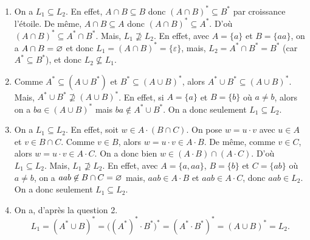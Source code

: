 \begin{enumerate}
\begin{enumerate}[label=\textit{(\arabic*)}]
			\item On a $L_1 \subseteq L_2$. En effet, $A \cap B \subseteq B$\/ donc $(A \cap B)^* \subseteq B^*$\/ par croissance l'étoile. De même, $A \cap B \subseteq A$\/ donc $(A \cap B)^* \subseteq A^*$. D'où $(A\cap B)^* \subseteq A^* \cap B^*$. Mais, $L_1 \not\supseteq L_2$. En effet, avec $A = \{a\}$\/ et $B = \{aa\}$, on a $A \cap B = \varnothing$\/ et donc $L_1 = (A \cap B)^* = \{\varepsilon\}$, mais, $L_2 = A^* \cap B^* = B^*$\/ (car $A^* \subseteq B^*$), et donc $L_2 \not\subseteq L_1$.
			\item Comme $A^* \subseteq (A \cup B^*)$\/ et $B^* \subseteq (A \cup B)^*$, alors $A^* \cup B^* \subseteq (A \cup B)^*$. Mais, $A^* \cup B^* \not\supseteq (A \cup B)^*$. En effet, si $A = \{a\}$\/ et $B = \{b\}$\/ où $a \neq b$, alors on a $ba \in (A \cup B)^*$\/ mais $ba\not\in A^* \cup B^*$. On a donc seulement $L_1 \subseteq L_2$.
			\item On a $L_1 \subseteq L_2$. En effet, soit $w \in A \cdot (B \cap C)$. On pose $w = u \cdot v$\/ avec $u \in A$\/ et $v \in B \cap C$. Comme $v \in B$, alors $w= u\cdot v \in A \cdot B$. De même, comme $v \in C$, alors $w = u\cdot v \in A \cdot C$. On a donc bien $w \in (A \cdot B) \cap (A \cdot C)$. D'où $L_1 \subseteq L_2$. Mais, $L_1 \not\supseteq L_2$. En effet, avec $A = \{a,aa\}$, $B = \{b\}$\/ et $C = \{ab\}$\/ où $a \neq b$, on a $aab \not\in B \cap C = \varnothing$\/ mais, $aab \in A\cdot B$\/ et $aab \in A\cdot C$, donc $aab \in L_2$.
				On a donc seulement $L_1 \subseteq L_2$.
			\item On a, d'après la question 2.\ \[L_1 = (A^* \cup B)^* = \big((A^*)^* \cdot B^*\big)^* = (A^* \cdot B^*)^* = (A \cup B)^* = L_2.\]
		\end{enumerate}
\end{enumerate}
